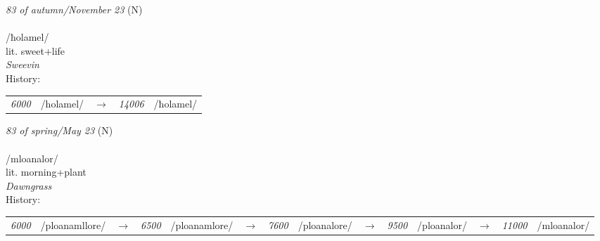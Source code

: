 \vspace{15pt}
\begin{nopagebreak}
 \textit{83 of autumn/November 23} (N)\\
\\
\noindent /ħol{\textprimstress}amel/\\
\noindent lit. sweet+life\\
\noindent \textit{Sweevin}\\


\noindent History:

\vspace{-0pt}
\hspace{40pt}
\begin{tabular}{ccc}
\textit{6000} & /holamel/&$\rightarrow$ & \textit{14006} & /ħolamel/& \\
\end{tabular}

\vspace{20pt}\hline

\end{nopagebreak}
\filbreak



\vspace{15pt}
\begin{nopagebreak}
 \textit{83 of spring/May 23} (N)\\
\\
\noindent /mloan{\textprimstress}alor/\\
\noindent lit. morning+plant\\
\noindent \textit{Dawngrass}\\


\noindent History:

\vspace{-0pt}
\hspace{40pt}
\begin{tabular}{ccc}
\textit{6000} & /ploanamllore/&$\rightarrow$ & \textit{6500} & /ploanamlore/&$\rightarrow$ & \textit{7600} & /ploanalore/&$\rightarrow$ & \textit{9500} & /ploanalor/&$\rightarrow$ & \textit{11000} & /mloanalor/& \\
\end{tabular}

\vspace{20pt}\hline

\end{nopagebreak}
\filbreak



